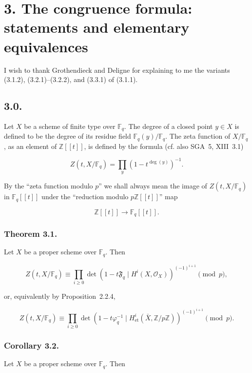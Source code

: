 \section*{3. The congruence formula: statements and elementary equivalences}

I wish to thank Grothendieck and Deligne for explaining to me the variants
(3.1.2), (3.2.1)--(3.2.2), and (3.3.1) of (3.1.1).

\subsection*{3.0.}
Let $X$ be a scheme of finite type over $\mathbb F_q$. The degree of a closed
point $y\in X$ is defined to be the degree of its residue field
$\mathbb F_q(y)/\mathbb F_q$. The zeta function of $X/\mathbb F_q$, as an
element of $\mathbb Z[[t]]$, is defined by the formula (cf. also SGA~5,
XIII~3.1)

\begin{equation}\tag{3.0.1}
Z(t,X/\mathbb F_q)=\prod_y(1-t^{\deg(y)})^{-1}.
\end{equation}

By the ``zeta function modulo $p$'' we shall always mean the image of
$Z(t,X/\mathbb F_q)$ in $\mathbb F_q[[t]]$ under the ``reduction modulo $p\mathbb Z[[t]]$''
map

\[
\mathbb Z[[t]]\longrightarrow\mathbb F_q[[t]].
\]

\subsubsection*{Theorem 3.1.}
Let $X$ be a proper scheme over $\mathbb F_q$. Then

\begin{equation}\tag{3.1.1}
Z(t,X/\mathbb F_q)
\equiv
\prod_{i\geq0}
\det\!\left(1-t\mathfrak F_q\mid H^i(X,\mathcal O_X)\right)^{(-1)^{i+1}}
\pmod p,
\end{equation}

or, equivalently by Proposition~2.2.4,

\begin{equation}\tag{3.1.2}
Z(t,X/\mathbb F_q)
\equiv
\prod_{i\geq0}
\det\!\left(1-t\varphi_q^{-1}\mid
H^i_{\mathrm{et}}(\bar X,\mathbb Z/p\mathbb Z)\right)^{(-1)^{i+1}}
\pmod p.
\end{equation}

\subsubsection*{Corollary 3.2.}
Let $X$ be a proper scheme over $\mathbb F_q$. Then

